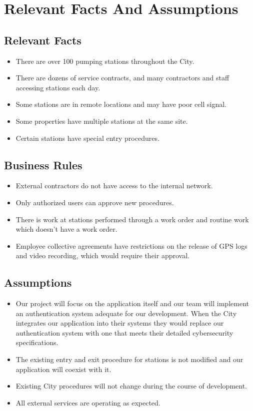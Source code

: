 \documentclass[12pt]{article}
\begin{document}
\section{Relevant Facts And Assumptions}
\subsection{Relevant Facts}
\begin{itemize}
  \item There are over 100 pumping stations throughout the City.
  \item There are dozens of service contracts, and many contractors
    and staff accessing stations each day.
  \item Some stations are in remote locations and may have poor cell signal.
  \item Some properties have multiple stations at the same site.
  \item Certain stations have special entry procedures.
\end{itemize}

\subsection{Business Rules}
\begin{itemize}
  \item External contractors do not have access to the internal network.
  \item Only authorized users can approve new procedures.
  \item There is work at stations performed through a work order
    and routine work which doesn't have a work order.
  \item Employee collective agreements have restrictions on the release of
    GPS logs and video recording, which would require their approval.
\end{itemize}
\subsection{Assumptions}
\begin{itemize}
  \item Our project will focus on the application itself
    and our team will implement an authentication system adequate for our
    development. When the City integrates our application into their systems
    they would replace our authentication system with one that meets their
    detailed cybersecurity specifications.
  \item The existing entry and exit procedure for stations is not modified
    and our application will coexist with it.
  \item Existing City procedures will not change during the course of
    development.
  \item All external services are operating as expected.
\end{itemize}
\end{document}
